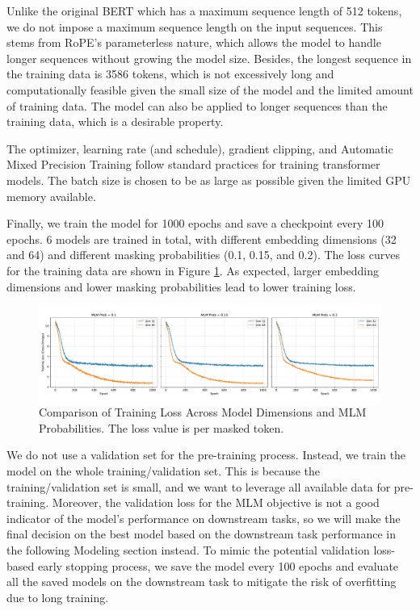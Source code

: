 \documentclass[10pt,letterpaper]{article}
\begin{document}
Unlike the original BERT which has a maximum sequence length of 512 tokens, we do not impose a maximum sequence length on the input sequences. This stems from RoPE's parameterless nature, which allows the model to handle longer sequences without growing the model size. Besides, the longest sequence in the training data is 3586 tokens, which is not excessively long and computationally feasible given the small size of the model and the limited amount of training data. The model can also be applied to longer sequences than the training data, which is a desirable property.

The optimizer, learning rate (and schedule), gradient clipping, and Automatic Mixed Precision Training follow standard practices for training transformer models. The batch size is chosen to be as large as possible given the limited GPU memory available.

Finally, we train the model for 1000 epochs and save a checkpoint every 100 epochs. 6 models are trained in total, with different embedding dimensions (32 and 64) and different masking probabilities (0.1, 0.15, and 0.2). The loss curves for the training data are shown in Figure \ref{fig:loss_curves}. As expected, larger embedding dimensions and lower masking probabilities lead to lower training loss.

\begin{figure}[ht]
    \centering
    \includegraphics[width=\textwidth]{figs/training_loss_comparison.pdf}
    \caption{Comparison of Training Loss Across Model Dimensions and MLM Probabilities. The loss value is per masked token.}
    \label{fig:loss_curves}
\end{figure}

We do not use a validation set for the pre-training process. Instead, we train the model on the whole training/validation set. This is because the training/validation set is small, and we want to leverage all available data for pre-training. Moreover, the validation loss for the MLM objective is not a good indicator of the model's performance on downstream tasks, so we will make the final decision on the best model based on the downstream task performance in the following Modeling section instead. To mimic the potential validation loss-based early stopping process, we save the model every 100 epochs and evaluate all the saved models on the downstream task to mitigate the risk of overfitting due to long training.
\end{document}
